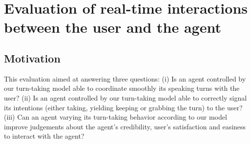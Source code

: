 \section{Evaluation of real-time interactions between the user and the agent}
\label{sec:eval}


\subsection{Motivation}

This evaluation aimed at answering three questions: 
(i) Is an agent controlled by our turn-taking model able to coordinate smoothly its speaking turns with the user?
(ii) Is an agent controlled by our turn-taking model able to correctly signal its intentions (either taking, yielding keeping or grabbing the turn) to the user?
(iii) Can an agent varying its turn-taking behavior according to our model improve judgements about the agent's credibility, user's satisfaction and easiness to interact with the agent?

